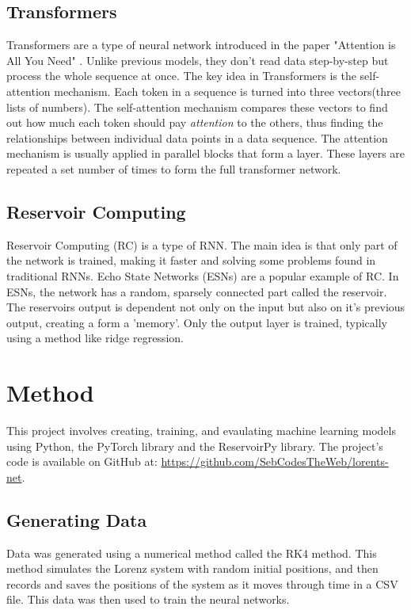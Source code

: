 \documentclass[11pt]{article}
\begin{document}
\subsection{Transformers}
Transformers are a type of neural network introduced in the paper "Attention is All You Need" \cite{DBLP:journals/corr/VaswaniSPUJGKP17}. Unlike previous models, they don't read data step-by-step but process the whole sequence at once. The key idea in Transformers is the self-attention mechanism. Each token in a sequence is turned into three vectors(three lists of numbers). The self-attention mechanism compares these vectors to find out how much each token should pay \emph{attention} to the others, thus finding the relationships between individual data points in a data sequence. The attention mechanism is usually applied in parallel blocks that form a layer. These layers are repeated a set number of times to form the full transformer network. 

\subsection{Reservoir Computing}
Reservoir Computing (RC) is a type of RNN. The main idea is that only part of the network is trained, making it faster and solving some problems found in traditional RNNs. Echo State Networks (ESNs) are a popular example of RC. In ESNs, the network has a random, sparsely connected part called the reservoir. The reservoirs output is dependent not only on the input but also on it's previous output, creating a form a 'memory'. Only the output layer is trained, typically using a method like ridge regression.


\section{Method}
This project involves creating, training, and evaulating machine learning models using Python, the PyTorch library and the ReservoirPy library. The project's code is available on GitHub at: \url{https://github.com/SebCodesTheWeb/lorents-net}.

\subsection{Generating Data}

Data was generated using a numerical method called the RK4 method. This method simulates the Lorenz system with random initial positions, and then records and saves the positions of the system as it moves through time in a CSV file. This data was then used to train the neural networks.
\end{document}
